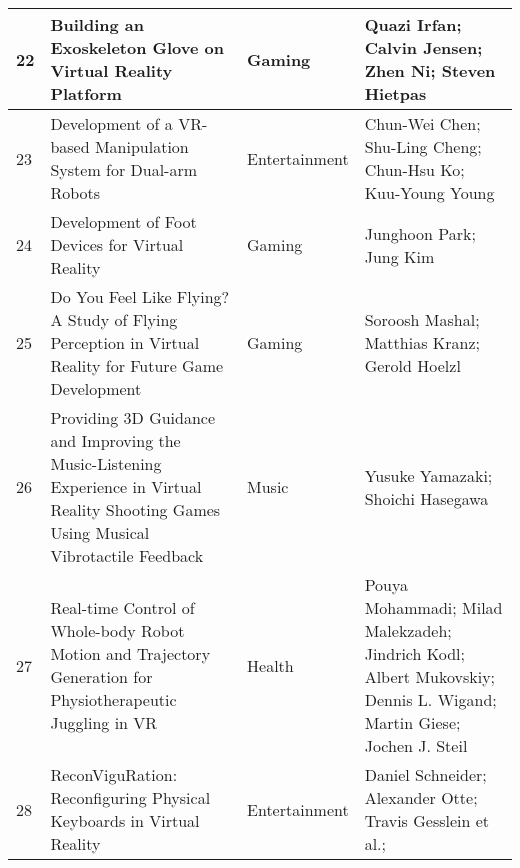 \begin{landscape}
\begin{table}[]
{\begin{tabular}{|l|l|l|l|}
				22                               & Building an Exoskeleton Glove on Virtual Reality Platform                                                                                 & Gaming                                   & Quazi Irfan; Calvin Jensen; Zhen Ni; Steven Hietpas                                                                    \\ \hline
				23                               & Development of a VR-based Manipulation System for Dual-arm Robots                                                                         & Entertainment                            & Chun-Wei Chen; Shu-Ling Cheng; Chun-Hsu Ko; Kuu-Young Young                                                          \\ \hline
				24                               & Development of Foot Devices for Virtual Reality                                                                                           & Gaming                                   & Junghoon Park; Jung Kim                                                                    \\ \hline
				25                               & Do You Feel Like Flying? A Study of Flying Perception in Virtual Reality for Future Game Development                                      & Gaming                                   & Soroosh Mashal; Matthias Kranz; Gerold Hoelzl                                                                      \\ \hline
				26                               & Providing 3D Guidance and Improving the Music-Listening Experience in Virtual Reality Shooting Games Using Musical Vibrotactile Feedback  & Music                                    & Yusuke Yamazaki; Shoichi Hasegawa                                                                     \\ \hline
				27                               & Real-time Control of Whole-body Robot Motion and Trajectory Generation for Physiotherapeutic Juggling in VR                               & Health                                   & Pouya Mohammadi; Milad Malekzadeh; Jindrich Kodl; Albert Mukovskiy; Dennis L. Wigand; Martin Giese; Jochen J. Steil                                                                 \\ \hline
				28                               & ReconViguRation: Reconfiguring Physical Keyboards in Virtual Reality                                                                      & Entertainment                            & Daniel Schneider; Alexander Otte; Travis Gesslein et al.;                                                                   \\ \hline

\end{tabular}}
\end{table}
\end{landscape}
